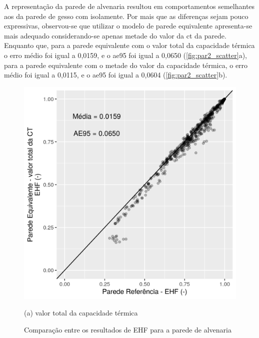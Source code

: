 \documentclass[brazil,hardcopy,openany]{ufscthesis} %
\begin{document}
A representação da parede de alvenaria resultou em comportamentos semelhantes aos da parede de gesso com isolamente.
Por mais que as diferenças sejam pouco expressivas, observou-se que utilizar o modelo de parede equivalente apresenta-se mais adequado considerando-se apenas metade do valor da \acrfull{ct} da parede. Enquanto que, para a parede equivalente com o valor total da capacidade térmica o erro médio foi igual a 0,0159, e o \acrshort{ae95} foi igual a 0,0650 (\ref{fig:par2_scatter}a), para a parede equivalente com o metade do valor da capacidade térmica, o erro médio foi igual a 0,0115, e o \acrshort{ae95} foi igual a 0,0604 (\ref{fig:par2_scatter}b).

\begin{figure}[h]
	\caption{Comparação entre os resultados de EHF para a parede de alvenaria}
	\begin{minipage}{.5\textwidth}
		\includegraphics[width=\linewidth]{img/paredeeq_EHF_par2a_scatter.png}
		\begin{center}
			\small{(a) valor total da capacidade térmica}
		\end{center}
	\end{minipage}%
	\begin{minipage}{.5\textwidth}

\end{minipage}
\end{figure}
\end{document}

